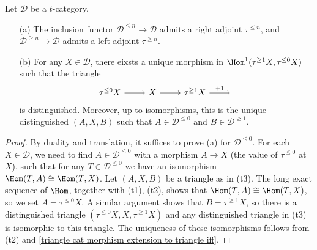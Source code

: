 \begin{proposition}\label{triangle cat t-structure truncation functor prop}
Let $\mathcal{D}$ be a $t$-category.
\begin{enumerate}
    \item[(a)] The inclusion functor $\mathcal{D}^{\leq n}\to\mathcal{D}$ admits a right adjoint $\tau^{\leq n}$, and $\mathcal{D}^{\geq n}\to\mathcal{D}$ admits a left adjoint $\tau^{\geq n}$.
    \item[(b)] For any $X\in\mathcal{D}$, there eixsts a unique morphism in $\Hom^1(\tau^{\geq 1}X,\tau^{\leq 0}X)$ such that the triangle
    \[\begin{tikzcd}
    \tau^{\leq 0}X\ar[r]&X\ar[r]&\tau^{\geq 1}X\ar[r,"+1"]&{}
    \end{tikzcd}\]
    is distinguished. Moreover, up to isomorphisms, this is the unique distinguished $(A,X,B)$ such that $A\in\mathcal{D}^{\leq 0}$ and $B\in\mathcal{D}^{\geq 1}$.
\end{enumerate}
\end{proposition}
\begin{proof}
By duality and translation, it suffices to prove (a) for $\mathcal{D}^{\leq 0}$. For each $X\in\mathcal{D}$, we need to find $A\in\mathcal{D}^{\leq 0}$ with a morphism $A\to X$ (the value of $\tau^{\leq 0}$ at $X$), such that for any $T\in\mathcal{D}^{\leq 0}$ we have an isomorphism $\Hom(T,A)\cong\Hom(T,X)$. Let $(A,X,B)$ be a triangle as in (t3). The long exact sequence of $\Hom$, together with (t1), (t2), shows that $\Hom(T,A)\cong\Hom(T,X)$, so we set $A=\tau^{\leq 0}X$. A similar argument shows that $B=\tau^{\geq 1}X$, so there is a distinguished triangle $(\tau^{\leq 0}X,X,\tau^{\geq 1}X)$ and any distinguished triangle in (t3) is isomorphic to this triangle. The uniqueness of these isomorphisms follows from (t2) and \cref{triangle cat morphism extension to triangle iff}.
\end{proof}

